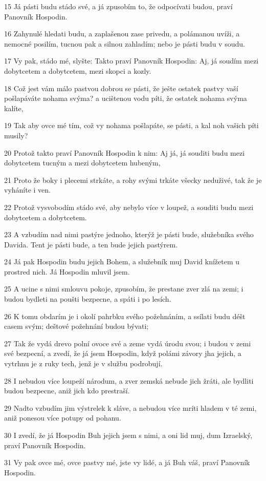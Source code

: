 \par 15 Já pásti budu stádo své, a já zpusobím to, že odpocívati budou, praví Panovník Hospodin.
\par 16 Zahynulé hledati budu, a zaplašenou zase privedu, a polámanou uvíži, a nemocné posilím, tucnou pak a silnou zahladím; nebo je pásti budu v soudu.
\par 17 Vy pak, stádo mé, slyšte: Takto praví Panovník Hospodin: Aj, já soudím mezi dobytcetem a dobytcetem, mezi skopci a kozly.
\par 18 Což jest vám málo pastvou dobrou se pásti, že ješte ostatek pastvy vaší pošlapáváte nohama svýma? a ucištenou vodu píti, že ostatek nohama svýma kalíte,
\par 19 Tak aby ovce mé tím, což vy nohama pošlapáte, se pásti, a kal noh vašich píti musily?
\par 20 Protož takto praví Panovník Hospodin k nim: Aj já, já souditi budu mezi dobytcetem tucným a mezi dobytcetem hubeným,
\par 21 Proto že boky i plecemi strkáte, a rohy svými trkáte všecky neduživé, tak že je vyháníte i ven.
\par 22 Protož vysvobodím stádo své, aby nebylo více v loupež, a souditi budu mezi dobytcetem a dobytcetem.
\par 23 A vzbudím nad nimi pastýre jednoho, kterýž je pásti bude, služebníka svého Davida. Tent je pásti bude, a ten bude jejich pastýrem.
\par 24 Já pak Hospodin budu jejich Bohem, a služebník muj David knížetem u prostred nich. Já Hospodin mluvil jsem.
\par 25 A ucine s nimi smlouvu pokoje, zpusobím, že prestane zver zlá na zemi; i budou bydleti na poušti bezpecne, a spáti i po lesích.
\par 26 K tomu obdarím je i okolí pahrbku svého požehnáním, a ssílati budu déšt casem svým; deštové požehnání budou bývati;
\par 27 Tak že vydá drevo polní ovoce své a zeme vydá úrodu svou; i budou v zemi své bezpecní, a zvedí, že já jsem Hospodin, když polámi závory jha jejich, a vytrhnu je z ruky tech, jenž je v službu podrobují.
\par 28 I nebudou více loupeží národum, a zver zemská nebude jich žráti, ale bydliti budou bezpecne, aniž jich kdo prestraší.
\par 29 Nadto vzbudím jim výstrelek k sláve, a nebudou více mríti hladem v té zemi, aniž ponesou více potupy od pohanu.
\par 30 I zvedí, že já Hospodin Buh jejich jsem s nimi, a oni lid muj, dum Izraelský, praví Panovník Hospodin.
\par 31 Vy pak ovce mé, ovce pastvy mé, jste vy lidé, a já Buh váš, praví Panovník Hospodin.

